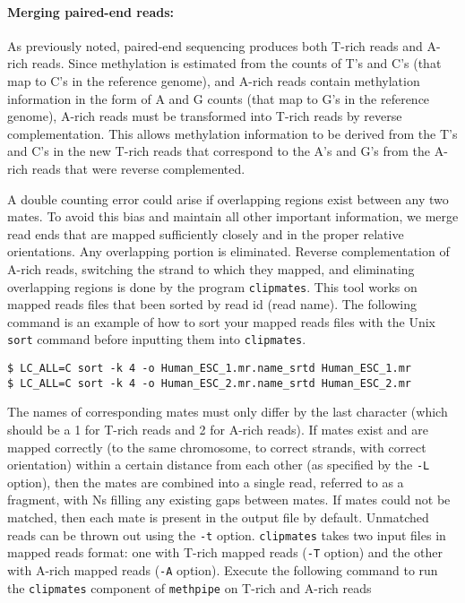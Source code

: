 \documentclass[10pt]{article}
\newcommand{\meth}{\texttt{methpipe}}
\newcommand{\prog}[1]{\texttt{#1}}
\newcommand{\op}[1]{\texttt{#1}}
\begin{document}
\paragraph{Merging paired-end reads:}
As previously noted, paired-end sequencing produces both T-rich reads
and A-rich reads. Since methylation is estimated from the counts of T's
and C's (that map to C's in the reference genome), and A-rich reads
contain methylation information in the form of A and G counts (that
map to G's in the reference genome), A-rich reads must be transformed
into T-rich reads by reverse complementation. This allows methylation
information to be derived from the T's and C's in the new T-rich reads
that correspond to the A's and G's from the A-rich reads that were
reverse complemented.

A double counting error could arise if overlapping regions exist
between any two mates. To avoid this bias and maintain all other
important information, we merge read ends that are mapped sufficiently
closely and in the proper relative orientations. Any overlapping portion
is eliminated. Reverse complementation of A-rich reads, switching
the strand to which they mapped, and eliminating overlapping regions is
done by the program \prog{clipmates}. This tool works on mapped reads
files that been sorted by read id (read name). The following command
is an example of how to sort your mapped reads files with the Unix
\prog{sort} command before inputting them into \prog{clipmates}.
\begin{verbatim}
$ LC_ALL=C sort -k 4 -o Human_ESC_1.mr.name_srtd Human_ESC_1.mr
$ LC_ALL=C sort -k 4 -o Human_ESC_2.mr.name_srtd Human_ESC_2.mr
\end{verbatim}
The names of corresponding mates must only differ by the last
character (which should be a 1 for T-rich reads and 2 for A-rich
reads). If mates exist and are mapped correctly (to the same
chromosome, to correct strands, with correct orientation) within a
certain distance from each other (as specified by the \op{-L} option),
then the mates are combined into a single read, referred to as a
fragment, with Ns filling any existing gaps between mates. If mates
could not be matched, then each mate is present in the output
file by default.  Unmatched reads can be thrown out using the \op{-t}
option.  \prog{clipmates} takes two input files in mapped reads format:
one with T-rich mapped reads (\op{-T} option) and the other with A-rich
mapped reads (\op{-A} option). Execute the following command to run the
\prog{clipmates} component of \meth{} on T-rich and A-rich reads
\end{document}
